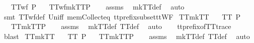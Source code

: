 \ \ \ {\isachardoublequoteopen}TTwf\ P{\isachardoublequoteclose}\isanewline
\ \ \ {\isachardoublequoteopen}TTwf{\isacharparenleft}mkTT{}{\isacharparenleft}P{\isacharparenright}{\isacharparenright}{\isachardoublequoteclose}\isanewline
%
\isadelimproof
\ \ %
\endisadelimproof
%
\isatagproof
{}\isamarkupfalse%
\ assms\ \isamarkupfalse%
\ mkTT{}{\isacharunderscore}def\ \isamarkupfalse%
\ auto\isanewline
\ \ \isamarkupfalse%
\ {\isacharparenleft}smt\ TTwf{\isacharunderscore}def\ Un{\isacharunderscore}iff\ mem{\isacharunderscore}Collect{\isacharunderscore}eq\ tt{\isacharunderscore}prefix{\isacharunderscore}subset{\isacharunderscore}ttWF{\isacharparenright}%
\endisatagproof
{\isafoldproof}%
%
\isadelimproof
\isanewline
%
\endisadelimproof
\isanewline
{}\isamarkupfalse%
\ TT{}{\isacharunderscore}mkTT{}{\isacharcolon}\isanewline
\ \ \ {\isachardoublequoteopen}TT{}\ P{\isachardoublequoteclose}\isanewline
\ \ \ {\isachardoublequoteopen}TT{}{\isacharparenleft}mkTT{}{\isacharparenleft}P{\isacharparenright}{\isacharparenright}{\isachardoublequoteclose}\isanewline
%
\isadelimproof
\ \ %
\endisadelimproof
%
\isatagproof
{}\isamarkupfalse%
\ assms\ \isamarkupfalse%
\ mkTT{}{\isacharunderscore}def\ TT{}{\isacharunderscore}def\ \isamarkupfalse%
\ auto\isanewline
\ \ \isamarkupfalse%
\ tt{\isacharunderscore}prefix{\isacharunderscore}of{\isacharunderscore}TT{}{\isacharunderscore}trace\ \isamarkupfalse%
\ blast%
\endisatagproof
{\isafoldproof}%
%
\isadelimproof
\isanewline
%
\endisadelimproof
\isanewline
{}\isamarkupfalse%
\ TT{}{\isacharunderscore}mkTT{}{\isacharcolon}\isanewline
\ \ \ {\isachardoublequoteopen}TT{}\ P{\isachardoublequoteclose}\isanewline
\ \ \ {\isachardoublequoteopen}TT{}{\isacharparenleft}mkTT{}{\isacharparenleft}P{\isacharparenright}{\isacharparenright}{\isachardoublequoteclose}\isanewline
%
\isadelimproof
\ \ %
\endisadelimproof
%
\isatagproof
{}\isamarkupfalse%
\ assms\ \isamarkupfalse%
\ mkTT{}{\isacharunderscore}def\ TT{}{\isacharunderscore}def\ \isamarkupfalse%
\ auto\isanewline
\ \ \isamarkupfalse%
